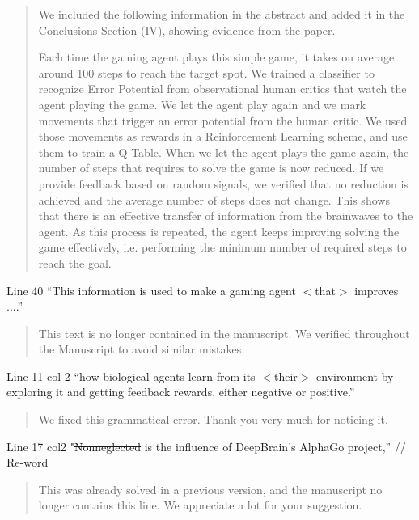 \documentclass[journal,onecolumn,12pt]{IEEEtran}
\begin{document}
\begin{quotation}
{\color{blue}
We included the following information in the abstract and added it in the Conclusions Section (IV), showing evidence from the paper.

Each time the gaming agent plays this simple game, it takes on average around 100 steps to reach the target spot.  We trained a classifier to recognize Error Potential from observational human critics that watch the agent playing the game.  We let the agent play again and we mark movements that trigger an error potential from the human critic.  We used those movements as rewards in a Reinforcement Learning scheme, and use them to train a Q-Table.  When we let the agent plays the game again, the number of steps that requires to solve the game is now reduced.  If we provide feedback based on random signals, we verified that no reduction is achieved and the average number of steps does not change.   This shows that there is an effective transfer of information from the brainwaves to the agent.   As this process is repeated, the agent keeps improving solving the game effectively, i.e. performing the minimum number of required steps to reach the goal.

}
\end{quotation}

Line 40 “This information is used to make a gaming agent $<$that$>$ improves ....”

\begin{quotation}
{\color{blue}
This text is no longer contained in the manuscript.  We verified throughout the Manuscript to avoid similar mistakes.
}
\end{quotation}

Line 11 col 2 “how biological agents learn from its $<$their$>$ environment by exploring it and getting feedback rewards, either negative or positive.”

\begin{quotation}
{\color{blue}
We fixed this grammatical error.  Thank you very much for noticing it.
}
\end{quotation}

Line 17 col2 "\sout{Nonneglected} is the influence of DeepBrain’s AlphaGo project,” // Re-word

\begin{quotation}
{\color{blue}
This was already solved in a previous version, and the manuscript no longer contains this line.  We appreciate a lot for your suggestion.
}
\end{quotation}
\end{document}
